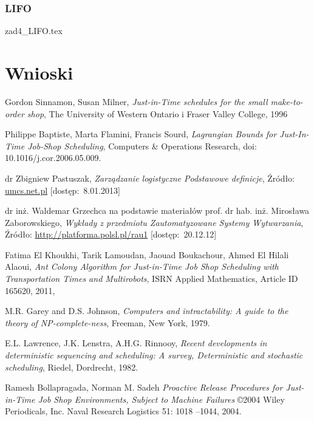 \documentclass[twoside]{kInzynierka}
\begin{document}
\subsubsection  {LIFO}
 {zad4_LIFO.tex}

\section        {Wnioski}
       




\begin{thebibliography}{99}

Gordon Sinnamon, Susan Milner,
\emph{Just-in-Time schedules for the small make-to-order shop},
The University of Western Ontario i Fraser Valley College, 1996

Philippe Baptiste, Marta Flamini, Francis Sourd,
\emph{Lagrangian Bounds for Just-In-Time Job-Shop Scheduling},
Computers \& Operations Research, doi: 10.1016/j.cor.2006.05.009.

dr Zbigniew Pastuszak,
\emph{Zarządzanie logistyczne Podstawowe definicje},
Źródło: \url{umcs.net.pl} [dostęp:~8.01.2013]

dr inż. Waldemar Grzechca na podstawie materiałów prof. dr hab. inż. Mirosława Zaborowskiego,
\emph{Wykłady z przedmiotu Zautomatyzowane Systemy Wytwarzania},
Źródło: \url{http://platforma.polsl.pl/rau1} [dostęp:~20.12.12]

Fatima El Khoukhi, Tarik Lamoudan, Jaouad Boukachour, Ahmed El Hilali Alaoui,  
\emph{Ant Colony Algorithm for Just-in-Time Job Shop Scheduling with Transportation Times and Multirobots},
ISRN Applied Mathematics, Article ID 165620, 2011, 

M.R. Garey and D.S. Johnson, 
\emph{Computers and intractability: A guide to the theory of NP-complete-ness},
Freeman, New York, 1979.

E.L. Lawrence, J.K. Lenstra, A.H.G. Rinnooy, 
\emph{Recent developments in deterministic sequencing and scheduling: A survey, Deterministic and stochastic scheduling},
Riedel, Dordrecht, 1982.

Ramesh Bollapragada, Norman M. Sadeh
\emph{Proactive Release Procedures for Just-in-Time Job Shop Environments, Subject to Machine Failures}
\copyright 2004 Wiley Periodicals, Inc. Naval Research Logistics 51: 1018 –1044, 2004.


\end{thebibliography}
\end{document}
